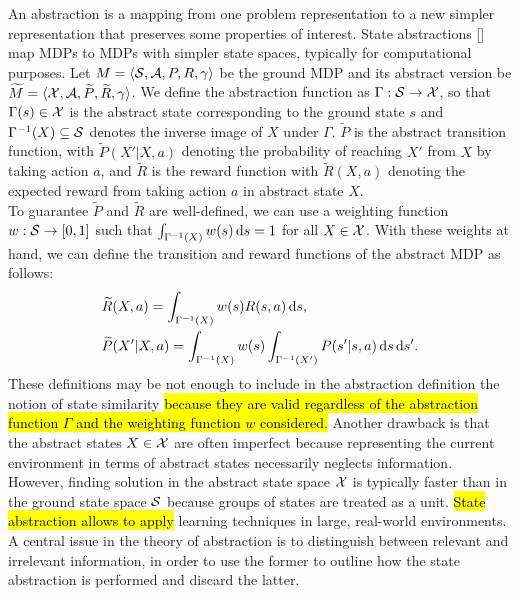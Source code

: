 An abstraction is a mapping from one problem representation to a new simpler representation that preserves some properties of interest. State abstractions [\cite{lihong2006towards}] map MDPs to MDPs with simpler state spaces, typically for computational purposes. Let $ M = \langle \mathcal{S}, \mathcal{A}, P, R, \gamma \rangle$ be the ground MDP and its abstract version be $\widetilde{M} = \langle \mathcal{X}, \mathcal{A}, \widetilde{P}, \widetilde{R}, \gamma \rangle$. We define the abstraction function as $\Gamma: \mathcal{S} \to \mathcal{X}$, so that $\Gamma(s)\in\mathcal{X}$ is the abstract state corresponding to the ground state $s$ and $\Gamma^{-1}(X)\subseteq\mathcal{S}$ denotes the inverse image of $X$ under $\Gamma$. $\widetilde{P}$ is the abstract transition function, with $\widetilde{P}(X'|X,a)$ denoting the probability of reaching $X'$ from $X$ by taking action $a$, and $\widetilde{R}$ is the reward function with $\widetilde{R}(X,a)$ denoting the expected reward from taking action $a$ in abstract state $X$.\\
\newline
To guarantee $\widetilde{P}$ and $\widetilde{R}$ are well-defined, we can use a weighting function  $w: \mathcal{S} \to [0, 1]$ such that $\int_{\Gamma^{-1}(X)} w(s)\,\mathrm{d} s = 1$ for all $X \in \mathcal{X}$. With these weights at hand, we can define the transition and reward functions of the abstract MDP as follows:
%
\begin{align}
&\widetilde{R}(X,a) = \int_{\Gamma^{-1}(X)}w(s)R(s,a)\,\mathrm{d} s,\nonumber \\
&\widetilde{P}(X'|X,a) = \int_{\Gamma^{-1}(X)}w(s)\int_{\Gamma^{-1}(X')} P(s'|s,a)\,\mathrm{d} s\,\mathrm{d} s'.\nonumber
\end{align}
%
These definitions may be not enough to include in the abstraction definition the notion of state similarity \hl{because they are valid regardless of the abstraction function $\Gamma$ and the weighting function $w$ considered.} Another drawback is that the abstract states $X \in \mathcal{X}$ are often imperfect because representing the current environment in terms of abstract states necessarily neglects information. However, finding solution in the abstract state space $\mathcal{X}$ is typically faster than in the ground state space $\mathcal{S}$ because groups of states are treated as a unit. \hl{State abstraction allows to apply} learning techniques in large, real-world environments. A central issue in the theory of abstraction is to distinguish between relevant and irrelevant information, in order to use the former to outline how the state abstraction is performed and discard the latter.\\
